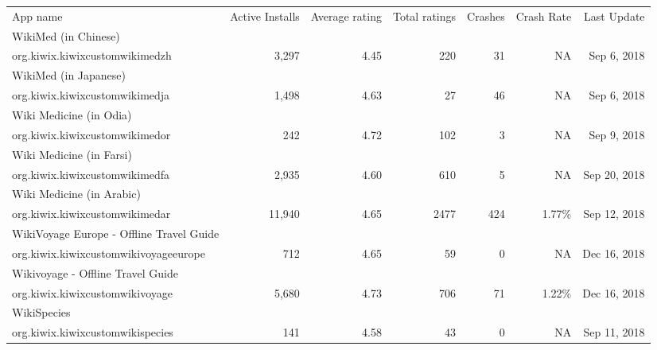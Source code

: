 \begin{table}
    \centering
    \tabcolsep=0.06cm
    \tiny
    \begin{tabular}{lrrrrrr}

	App name &Active Installs & Average rating & Total ratings & Crashes & Crash Rate & Last Update \\ 
WikiMed (in Chinese)  &  &  &  &  &  &  \\
	org.kiwix.kiwixcustomwikimedzh & 3,297  & 4.45 & 220 & 31 & NA & Sep 6, 2018 \\
	WikiMed (in Japanese)  &  &  &  &  &  &  \\
	org.kiwix.kiwixcustomwikimedja & 1,498  & 4.63 & 27 & 46 & NA & Sep 6, 2018 \\ 
	Wiki Medicine (in Odia) &  &  &  &  &  &  \\ 
	org.kiwix.kiwixcustomwikimedor &242  & 4.72 & 102 & 3 & NA & Sep 9, 2018 \\ 
    Wiki Medicine (in Farsi) &  &  &  &  &  &  \\ 
	org.kiwix.kiwixcustomwikimedfa &2,935  & 4.60 & 610 & 5 & NA &  Sep 20, 2018 \\ 
	Wiki Medicine (in Arabic) &  &  &  &  &  &  \\
	org.kiwix.kiwixcustomwikimedar &11,940  & 4.65 & 2477 & 424 & 1.77\% & Sep 12, 2018 \\ 
	WikiVoyage Europe - Offline Travel Guide &  &  &  &  &  &  \\ 
	org.kiwix.kiwixcustomwikivoyageeurope &712  & 4.65 & 59 & 0 & NA & Dec 16, 2018 \\ 
	Wikivoyage - Offline Travel Guide &  &  &  &  &  &  \\ 
	org.kiwix.kiwixcustomwikivoyage &5,680  & 4.73 & 706 & 71 & 1.22\% &Dec 16, 2018  \\ 
	WikiSpecies &  &  &  &  &  &  \\ 
	org.kiwix.kiwixcustomwikispecies &141  & 4.58 & 43 & 0 & NA & Sep 11, 2018 \\ 

\end{tabular}
\end{table}
